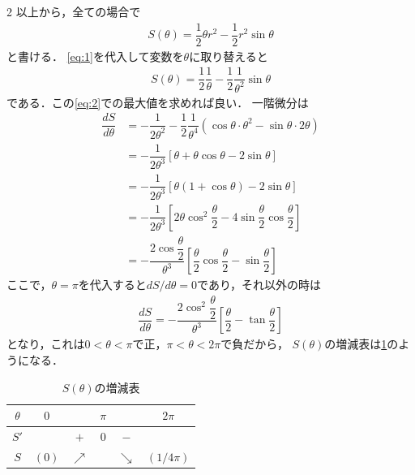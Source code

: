 \documentclass[../../main.tex]{subfiles}
\begin{document}
\begin{multicols}{2}
  以上から，全ての場合で
  \begin{align}
    S(\theta) = \dfrac{1}{2}\theta r^2 - \dfrac{1}{2}r^2\sin\theta
  \end{align}
  と書ける．
  \cref{eq:1}を代入して変数を$\theta$に取り替えると
  \begin{align}
    S(\theta) = \dfrac{1}{2}\dfrac{1}{\theta} - \dfrac{1}{2} \dfrac{1}{\theta^2}\sin\theta
  \end{align}
  である．この\cref{eq:2}での最大値を求めれば良い．
  一階微分は
  \begin{align}
    \dfrac{dS}{d\theta}
    & = -\dfrac{1}{2\theta^2} - \dfrac{1}{2} \dfrac{1}{\theta^4} (\cos\theta \cdot \theta^2 - \sin\theta \cdot 2\theta)     \\
    & = -\dfrac{1}{2\theta^3} [\theta + \theta\cos\theta - 2\sin\theta]                                                   \\
    & = -\dfrac{1}{2\theta^3} [\theta(1+\cos\theta) - 2\sin\theta]                                                        \\
    & = -\dfrac{1}{2\theta^3} [2\theta\cos^2\dfrac{\theta}{2} - 4\sin\dfrac{\theta}{2}\cos\dfrac{\theta}{2}]                 \\
    & = -\dfrac{2\cos\dfrac{\theta}{2}}{\theta^3} \left[\dfrac{\theta}{2}\cos\dfrac{\theta}{2} - \sin\dfrac{\theta}{2}\right]
  \end{align}
  ここで，$\theta=\pi$を代入すると$dS/d\theta=0$であり，それ以外の時は
  \begin{align}
    \dfrac{dS}{d\theta}= -\dfrac{2\cos^2\dfrac{\theta}{2}}{\theta^3} \left[\dfrac{\theta}{2} - \tan\dfrac{\theta}{2}\right]
  \end{align}
  となり，これは$0<\theta<\pi$で正，$\pi<\theta<2\pi$で負だから，
  $S(\theta)$の増減表は\cref{1994-5:table:1}のようになる．

  \begin{table}[H]
    \centering
    \caption{$S(\theta)$の増減表}
    \label{1994-5:table:1}
    \begin{tabular}{|c||c|c|c|c|c|}
      \hline
      $\theta$ & $0$   &            & $\pi$ &            & $2\pi$     \\
      \hline
      $S'$     &       & $+$        & $0$   & $-$        &            \\
      \hline
      $S$      & $(0)$ & $\nearrow$ &       & $\searrow$ & $(1/4\pi)$ \\
      \hline
    \end{tabular}
  \end{table}


\end{multicols}
\end{document}
